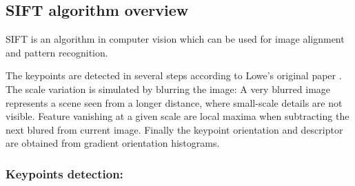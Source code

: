 \documentclass[preprint]{iucr}
\begin{document}
\subsection{SIFT algorithm overview}
SIFT is an algorithm in computer vision which can be used for image alignment
and pattern recognition.



The keypoints are detected in several steps according to Lowe's
original paper \cite{Lowe99}.
The scale variation is simulated by blurring the image:
A very blurred image represents a scene seen from a longer distance, where
small-scale details are not visible. Feature vanishing at a given scale are
local maxima when subtracting the next blured from current image. Finally the
keypoint orientation and descriptor are obtained from gradient orientation
histograms.


\subsubsection{Keypoints detection:}
\end{document}
